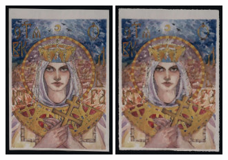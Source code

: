 \begin{figure}
     \centering
     \begin{subfigure}[b]{0.5\textwidth}
         \centering
         \hfil
         \caption{}
     \end{subfigure}
     \hfil
     \begin{subfigure}[b]{0.5\textwidth}
         \centering
         \includegraphics[width=0.45\textwidth]{images/style_augments/2019_14-17_0193_RUS_R_C.jpg}\hfil
         \includegraphics[width=0.45\textwidth]{images/style_augments/2019_14-17_0193_RUS_R_C_oil.jpg}
         \caption{}
     \end{subfigure}

\end{figure}

